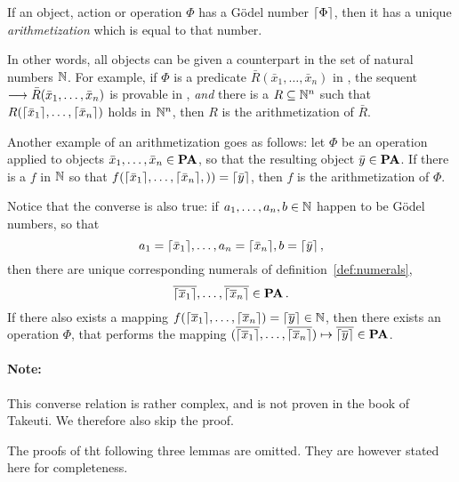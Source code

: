 \documentclass[11pt,a4paper]{article}
\begin{document}
\begin{definition}[Arithmetization]\label{def:arithmetization}
    If an object, action or operation \(\Phi\) has a Gödel number \(\lceil\Phi\rceil\),
    then it has a unique \emph{arithmetization} which is equal to that number.
\end{definition}

In other words, all objects can be given a counterpart in the set
of natural numbers \(\mathbb{N}\). For example, if \(\Phi\) is a predicate
\(\bar R(\bar x_1,\ldots,\bar x_n)\) in \PA{},
the sequent \(\longrightarrow\bar R(\bar x_1,\ldots,\bar x_n)\) is provable in \PA{},
\emph{and} there is a \PRR{} \(R\subseteq \mathbb{N}^n\)
such that \(R(\lceil\bar x_1\rceil,\ldots,\lceil\bar x_n\rceil)\)
holds in \(\mathbb{N}^n\), then \(R\) is the arithmetization of \(\bar R\).

Another example of an arithmetization goes as follows:
let \(\Phi\) be an operation applied to objects
\(\bar x_1,\ldots,\bar x_n \in\textbf{PA}\),
so that the resulting object \(\bar y\in\textbf{PA}{}\).
If there is a \PRF{} \(f\) in \(\mathbb{N}\) so that
\(f(\lceil\bar x_1\rceil,\ldots,\lceil\bar x_n\rceil,)) = \lceil\bar y\rceil\),
then \(f\) is the arithmetization of \(\Phi\).

Notice that the converse is also true:
if \(a_1,\ldots,a_n,b\in\mathbb{N}\) happen to be
Gödel numbers, so that
\begin{equation*}
    a_1 = \lceil\bar x_1\rceil,\ldots, a_n = \lceil\bar x_n\rceil, b = \lceil\bar y\rceil\,,
\end{equation*}
then there are unique corresponding numerals of definition~\ref{def:numerals},
\begin{equation*}
    \overline{\lceil\overline{x}_1\rceil},\ldots,\overline{\lceil\overline{x}_n\rceil} \in\textbf{PA}\,.
\end{equation*}
If there also exists a mapping
\(f(\lceil\overline{x}_1\rceil,\ldots,\lceil\overline{x}_n\rceil) = \lceil\overline{y}\rceil \in\mathbb{N}\),
then there exists an operation \(\Phi\), that performs the mapping
\((\overline{\lceil\overline{x}_1\rceil},\ldots,\overline{\lceil\overline{x}_n\rceil})\mapsto\overline{\lceil\overline{y}\rceil}\in\textbf{PA}{}\).

\paragraph{Note:}
This converse relation is rather complex, and is not proven
in the book of Takeuti. We therefore also skip the proof. {\Large\trollface}

The proofs of tht following three lemmas are omitted.
They are however stated here for completeness.
\end{document}

